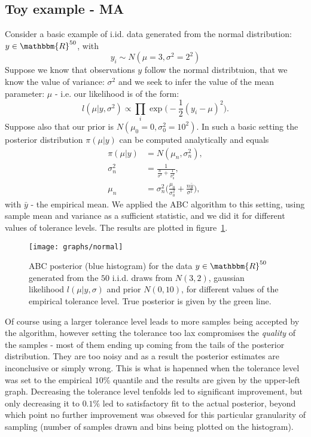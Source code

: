 \documentclass[fleqn,10pt]{SelfArx} %
\begin{document}
\subsection{Toy example - MA}
Consider a basic example of i.id. data generated from the normal distribution: $y\in\mathbbm{R}^{50}$, with
\begin{equation}
y_i\sim N(\mu = 3,\sigma^2 = 2^2)
\end{equation}
Suppose we know that observations $y$ follow the normal distribtuion, that we know the value of variance: $\sigma^2$ and we seek to infer the value of the mean parameter: $\mu$ - i.e. our likelihood is of the form:
\begin{equation}
l(\mu|y, \sigma^2) \propto \prod_i \exp\bigg( -\frac{1}{2}(y_i-\mu)^2 \bigg).
\end{equation}
Suppose also that our prior is $N(\mu_0 = 0,\sigma_0^2 = 10^2)$. In such a basic setting the posterior distribution $\pi(\mu|y)$ can be computed analytically and equals
\begin{equation}
\begin{split}
\pi(\mu|y) &= N(\mu_n,\sigma_n^2),\\
\sigma_n^2 &= \frac{1}{\frac{n}{\sigma^2}+\frac{1}{\sigma^2_0}},\\
\mu_n &= \sigma_n^2 \bigg( \frac{\mu_0}{\sigma_0^2}+ \frac{n\bar{y}}{\sigma^2}\bigg),
\end{split}
\end{equation}
with $\bar{y}$ - the empirical mean. We applied the ABC algorithm to this setting, using sample mean and variance as a sufficient statistic, and we did it for different values of tolerance levels. The results are plotted in figure~\ref{fig:normal}.
\begin{figure}[ht]\centering
\texttt{[image: graphs/normal]}
\caption{ABC posterior (blue histogram) for the data $y\in\mathbbm{R}^{50}$ generated from the $50$ i.i.d. draws from $N(3,2)$, gaussian likelihood $l(\mu|y,\sigma)$ and prior $N(0,10)$, for different values of the empirical tolerance level. True posterior is given by the green line. }
\label{fig:normal}
\end{figure}
Of course using a larger tolerance level leads to more samples being accepted by the algorithm, however setting the tolerance too lax compromises the \emph{quality} of the samples - most of them ending up coming from the tails of the posterior distribution. They are too noisy and as a result the posterior estimates are inconclusive or simply wrong. This is what is hapenned when the tolerance level was set to the empirical $10\%$ quantile and the results are given by the upper-left graph. Decreasing the tolerance level tenfolds led to significant improvement, but only decreasing it to $0.1\%$ led to satisfactory fit to the actual posterior, beyond which point no further improvement was obseved for this particular granularity of sampling (number of samples drawn and bins being plotted on the histogram).
\end{document}

